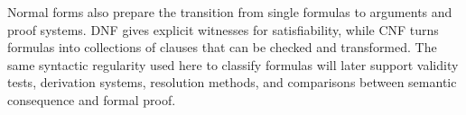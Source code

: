 \begin{remark*}
Normal forms also prepare the transition from single formulas to arguments and
proof systems. DNF gives explicit witnesses for satisfiability, while CNF turns
formulas into collections of clauses that can be checked and transformed. The
same syntactic regularity used here to classify formulas will later support
validity tests, derivation systems, resolution methods, and comparisons between
semantic consequence and formal proof.
\end{remark*}
